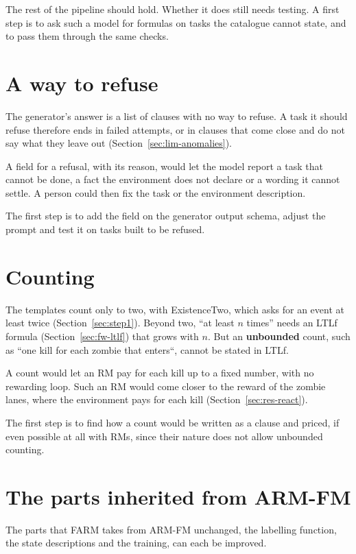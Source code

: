 \documentclass[11pt,english,listoffigures,listoftables]{tfgetsinf}
\begin{document}
The rest of the pipeline should hold. Whether it does still needs testing. A first step is to ask such a model for formulas on tasks the catalogue cannot state, and to pass them through the same checks.

\section{A way to refuse}
\label{sec:fw-refusal}
The generator's answer is a list of clauses with no way to refuse. A task it should refuse therefore ends in failed attempts, or in clauses that come close and do not say what they leave out (Section~\ref{sec:lim-anomalies}).

A field for a refusal, with its reason, would let the model report a task that cannot be done, a fact the environment does not declare or a wording it cannot settle. A person could then fix the task or the environment description. 

The first step is to add the field  on the generator output schema, adjust the prompt and test it on tasks built to be refused.

\section{Counting}
\label{sec:fw-counting}
The templates count only to two, with ExistenceTwo, which asks for an event at least twice (Section~\ref{sec:step1}). Beyond two, ``at least $n$ times'' needs an LTLf formula (Section~\ref{sec:fw-ltlf}) that grows with $n$. But an \textbf{unbounded} count, such as ``one kill for each zombie that enters``, cannot be stated in LTLf.

A count would let an RM pay for each kill up to a fixed number, with no rewarding loop. Such an RM would come closer to the reward of the zombie lanes, where the environment pays for each kill (Section~\ref{sec:res-react}). 

The first step is to find how a count would be written as a clause and priced, if even possible at all with RMs, since their nature does not allow unbounded counting.

\section{The parts inherited from ARM-FM}
\label{sec:fw-inherited}
The parts that FARM takes from ARM-FM unchanged, the labelling function, the state descriptions and the training, can each be improved.
\end{document}
